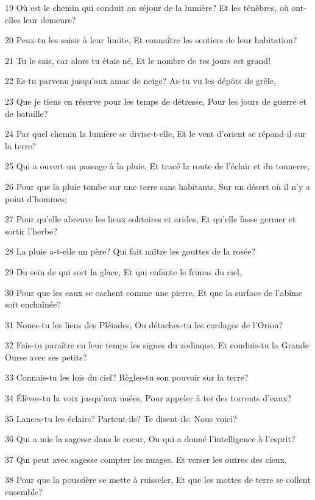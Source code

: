 \par 19 Où est le chemin qui conduit au séjour de la lumière? Et les ténèbres, où ont-elles leur demeure?
\par 20 Peux-tu les saisir à leur limite, Et connaître les sentiers de leur habitation?
\par 21 Tu le sais, car alors tu étais né, Et le nombre de tes jours est grand!
\par 22 Es-tu parvenu jusqu'aux amas de neige? As-tu vu les dépôts de grêle,
\par 23 Que je tiens en réserve pour les temps de détresse, Pour les jours de guerre et de bataille?
\par 24 Par quel chemin la lumière se divise-t-elle, Et le vent d'orient se répand-il sur la terre?
\par 25 Qui a ouvert un passage à la pluie, Et tracé la route de l'éclair et du tonnerre,
\par 26 Pour que la pluie tombe sur une terre sans habitants, Sur un désert où il n'y a point d'hommes;
\par 27 Pour qu'elle abreuve les lieux solitaires et arides, Et qu'elle fasse germer et sortir l'herbe?
\par 28 La pluie a-t-elle un père? Qui fait naître les gouttes de la rosée?
\par 29 Du sein de qui sort la glace, Et qui enfante le frimas du ciel,
\par 30 Pour que les eaux se cachent comme une pierre, Et que la surface de l'abîme soit enchaînée?
\par 31 Noues-tu les liens des Pléiades, Ou détaches-tu les cordages de l'Orion?
\par 32 Fais-tu paraître en leur temps les signes du zodiaque, Et conduis-tu la Grande Ourse avec ses petits?
\par 33 Connais-tu les lois du ciel? Règles-tu son pouvoir sur la terre?
\par 34 Élèves-tu la voix jusqu'aux nuées, Pour appeler à toi des torrents d'eaux?
\par 35 Lances-tu les éclairs? Partent-ils? Te disent-ils: Nous voici?
\par 36 Qui a mis la sagesse dans le coeur, Ou qui a donné l'intelligence à l'esprit?
\par 37 Qui peut avec sagesse compter les nuages, Et verser les outres des cieux,
\par 38 Pour que la poussière se mette à ruisseler, Et que les mottes de terre se collent ensemble?

